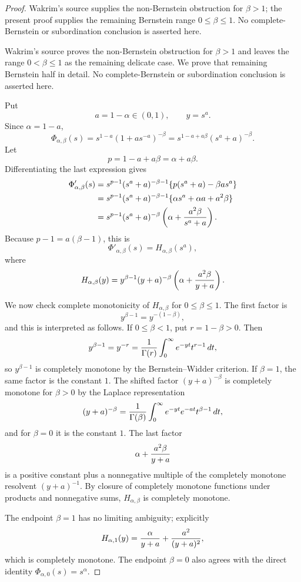\begin{proof}
Wakrim's source supplies the non-Bernstein obstruction for \(\beta>1\); the present proof supplies the remaining Bernstein range \(0\le\beta\le1\). No complete-Bernstein or subordination conclusion is asserted here.

Wakrim's source proves the non-Bernstein obstruction for \(\beta>1\) and
leaves the range \(0<\beta\le1\) as the remaining delicate case.  We prove
that remaining Bernstein half in detail.  No complete-Bernstein or
subordination conclusion is asserted here.

Put
\[
  a=1-\alpha\in(0,1),\qquad y=s^a .
\]
Since \(\alpha=1-a\),
\[
 \Phi_{\alpha,\beta}(s)
 =s^{1-a}(1+a s^{-a})^{-\beta}
 =s^{1-a+a\beta}(s^a+a)^{-\beta}.
\]
Let
\[
  p=1-a+a\beta=\alpha+a\beta .
\]
Differentiating the last expression gives
\[
\begin{aligned}
 \Phi'_{\alpha,\beta}(s)
 &=s^{p-1}(s^a+a)^{-\beta-1}
     \{p(s^a+a)-\beta a s^a\}  \\
 &=s^{p-1}(s^a+a)^{-\beta-1}
     \{\alpha s^a+\alpha a+a^2\beta\}       \\
 &=s^{p-1}(s^a+a)^{-\beta}
     \left(\alpha+{a^2\beta\over s^a+a}\right).
\end{aligned}
\]
Because \(p-1=a(\beta-1)\), this is
\[
  \Phi'_{\alpha,\beta}(s)=H_{\alpha,\beta}(s^a),
\]
where
\[
 H_{\alpha,\beta}(y)
 =y^{\beta-1}(y+a)^{-\beta}
      \left(\alpha+{a^2\beta\over y+a}\right).
\]

We now check complete monotonicity of \(H_{\alpha,\beta}\) for
\(0\le\beta\le1\).  The first factor is
\[
  y^{\beta-1}=y^{-(1-\beta)},
\]
and this is interpreted as follows.  If \(0\le\beta<1\), put
\(r=1-\beta>0\).  Then
\[
  y^{\beta-1}=y^{-r}
  ={1\over\Gamma(r)}
    \int_0^\infty e^{-yt}t^{r-1}\,dt,
\]
so \(y^{\beta-1}\) is completely monotone by the Bernstein--Widder
criterion.  If \(\beta=1\), the same factor is the constant \(1\).  The shifted factor
\((y+a)^{-\beta}\) is completely monotone for \(\beta>0\) by the Laplace
representation
\[
 (y+a)^{-\beta}
 ={1\over\Gamma(\beta)}
   \int_0^\infty e^{-yt}e^{-at}t^{\beta-1}\,dt,
\]
and for \(\beta=0\) it is the constant \(1\).  The last factor
\[
  \alpha+{a^2\beta\over y+a}
\]
is a positive constant plus a nonnegative multiple of the completely monotone
resolvent \((y+a)^{-1}\).  By closure of completely monotone functions under
products and nonnegative sums, \(H_{\alpha,\beta}\) is completely monotone.

The endpoint \(\beta=1\) has no limiting ambiguity; explicitly
\[
 H_{\alpha,1}(y)
 ={\alpha\over y+a}+{a^2\over (y+a)^2},
\]
which is completely monotone.  The endpoint \(\beta=0\) also agrees with the
direct identity \(\Phi_{\alpha,0}(s)=s^\alpha\).


\end{proof}

